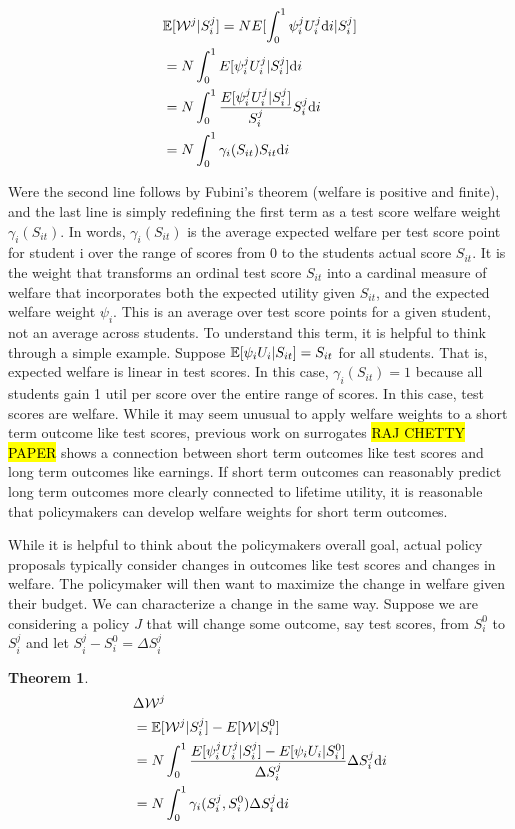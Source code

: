 \documentclass[12pt]{article}
\theoremstyle{definition}
\theoremstyle{definition}
\theoremstyle{definition}
\theoremstyle{definition}
\newtheorem{thm}{Theorem}
\begin{document}
    \begin{align}
           & \mathbb{E}[\mathcal{W}^j|S_i^j] = N E[\int_0^1 \psi^j_i U^j_i \text{d}i|S_i^j] \\
           & = N \int_0^1 E[\psi^j_i U^j_i |S_i^j] \text{d}i \\ 
           &  = N \int_0^1 \frac{E[\psi^j_i U^j_i |S_i^j]}{S_i^j} S_i^j\text{d}i \\ 
          &   = N \int_0^1 \gamma_i(S_{it}) S_{it} \text{d}i
    \end{align}

   Were the second line follows by Fubini's theorem (welfare is positive and finite), and the last line is simply redefining the first term as a test score welfare weight $\gamma_i(S_{it})$. In words, $\gamma_i(S_{it})$  is the average expected welfare per test score point for student i over the range of scores from 0 to the students actual score $S_{it}$. It is the weight that transforms an ordinal test score $S_{it}$ into a cardinal measure of welfare that incorporates both the expected utility given $S_{it}$, and the expected welfare weight $\psi_i$. This is an average over test score points for a given student, not an average across students. To understand this term, it is helpful to think through a simple example. Suppose  $ \mathbb{E}[ \psi_i U_{i} |S_{it}]= S_{it}$ for all students. That is, expected welfare is linear in test scores. In this case,  $\gamma_i(S_{it}) = 1$ because all students gain 1 util per score over the entire range of scores. In this case, test scores are welfare. While it may seem unusual to apply welfare weights to a short term outcome like test scores, previous work on surrogates \hl{RAJ CHETTY PAPER} shows a connection between short term outcomes like test scores and long term outcomes like earnings. If short term outcomes can reasonably predict long term outcomes more clearly connected to lifetime utility, it is reasonable that policymakers can develop welfare weights for short term outcomes. 

   While it is helpful to think about the policymakers overall goal, actual policy proposals typically consider changes in outcomes like test scores and changes in welfare. The policymaker will then want to maximize the change in welfare given their budget. We can characterize a change in the same way. Suppose we are considering a policy $J$ that will change some outcome, say test scores, from $S_i^0$ to $S_i^j$ and let $S_i^j- S_i^0 = \Delta S^j_i$

    \begin{thm}
    \label{def_welfare_change}
    \begin{align}
           &  \Delta \mathcal{W}^j \\
           & = \mathbb{E}[\mathcal{W}^j|S_i^j] - E[\mathcal{W}|S_i^0]  \\
           &  = N \int_0^1 \frac{E[\psi^j_i U^j_i |S_i^j] - E[\psi_i U_i |S_i^0]}{\Delta S^j_i} \Delta S^j_i\text{d}i \\ 
          &   = N \int_0^1 \gamma_i(S_i^j, S_i^0) \Delta S^j_i \text{d}i
    \end{align}
    \end{thm}
\end{document}
